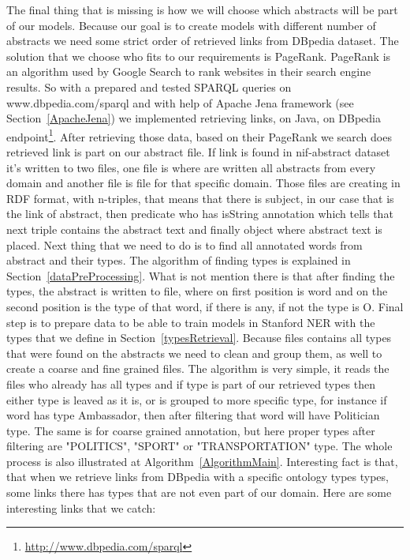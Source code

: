 \documentclass[thesis=M,english]{FITthesis}[2018/05/30]
\begin{document}
	The final thing that is missing is how we will choose which abstracts will be part of our models. Because our goal is to create models with different number of abstracts we need some strict order of retrieved links from DBpedia dataset. The solution that we choose who fits to our requirements is PageRank. PageRank \cite{wiki:PR} is an algorithm used by Google Search to rank websites in their search engine results. So with a prepared and tested SPARQL queries on www.dbpedia.com/sparql and  with help of Apache Jena framework (see Section~\ref{ApacheJena}) we implemented retrieving links, on Java, on DBpedia endpoint\footnote{\url{http://www.dbpedia.com/sparql}}. After retrieving those data, based on their PageRank we search does retrieved link is part on our abstract file. If link is found in nif-abstract dataset it's written to two files, one file is where are written all abstracts from every domain and another file is file for that specific domain. Those files are creating in RDF format, with n-triples, that means that there is subject, in our case that is the link of abstract, then predicate who has isString annotation which tells that next triple contains the abstract text and finally object where abstract text is placed. Next thing that we need to do is to find all annotated words from abstract and their types. The algorithm of finding types is explained in Section~\ref{dataPreProcessing}. What is not mention there is that after finding the types, the abstract is written to file, where on first position is word and on the second position is the type of that word, if there is any, if not the type is O. Final step is to prepare data to be able to train models in Stanford NER with the types that we define in Section~\ref{typesRetrieval}. Because files contains all types that were found on the abstracts we need to clean and group them, as well to create a coarse and fine grained files. The algorithm is very simple, it reads the files who already has all types and if type is part of our retrieved types then either type is leaved as it is, or is grouped to more specific type, for instance if word has type Ambassador, then after filtering that word will have Politician type. The same is for coarse grained annotation, but here proper types after filtering are "POLITICS", "SPORT" or "TRANSPORTATION" type. The whole process is also illustrated at Algorithm~\ref{AlgorithmMain}.
		Interesting fact is that, that when we retrieve links from DBpedia with a specific ontology types types, some links there has types that are not even part of our domain. Here are some interesting links that we catch:
	
\end{document}
